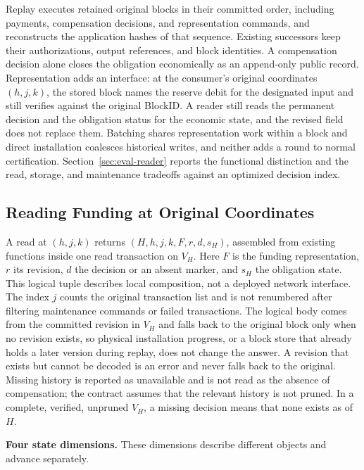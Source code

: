 Replay executes retained original blocks in their committed order, including payments, compensation decisions, and representation commands, and reconstructs the application hashes of that sequence. Existing successors keep their authorizations, output references, and block identities. A compensation decision alone closes the obligation economically as an append-only public record. Representation adds an interface: at the consumer's original coordinates $(h,j,k)$, the stored block names the reserve debit for the designated input and still verifies against the original BlockID. A reader still reads the permanent decision and the obligation status for the economic state, and the revised field does not replace them. Batching shares representation work within a block and direct installation coalesces historical writes, and neither adds a round to normal certification. Section~\ref{sec:eval-reader} reports the functional distinction and the read, storage, and maintenance tradeoffs against an optimized decision index.

\subsection{Reading Funding at Original Coordinates}
\label{sec:protocol-reader}

A read at $(h,j,k)$ returns $(H,h,j,k,F,r,d,s_H)$, assembled from existing functions inside one read transaction on $V_H$. Here $F$ is the funding representation, $r$ its revision, $d$ the decision or an absent marker, and $s_H$ the obligation state. This logical tuple describes local composition, not a deployed network interface. The index $j$ counts the original transaction list and is not renumbered after filtering maintenance commands or failed transactions. The logical body comes from the committed revision in $V_H$ and falls back to the original block only when no revision exists, so physical installation progress, or a block store that already holds a later version during replay, does not change the answer. A revision that exists but cannot be decoded is an error and never falls back to the original. Missing history is reported as unavailable and is not read as the absence of compensation; the contract assumes that the relevant history is not pruned. In a complete, verified, unpruned $V_H$, a missing decision means that none exists as of $H$.

\noindent\textbf{Four state dimensions.}
These dimensions describe different objects and advance separately.

